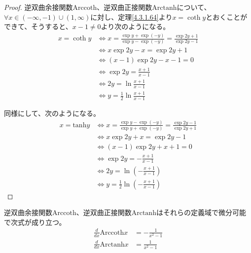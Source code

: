 \documentclass[dvipdfmx]{jsarticle}
\begin{document}
\begin{proof}
逆双曲余接関数$\mathrm{Arccoth}$、逆双曲正接関数$\mathrm{Arctanh}$について、$\forall x \in ( - \infty, - 1) \cup (1,\infty)$に対し、定理\ref{4.3.1.64}より$x = \coth y$とおくことができて、そうすると、$x - 1 \neq 0$より次のようになる。
\begin{align*}
x = \coth y &\Leftrightarrow x = \frac{\exp y + \exp( - y)}{\exp y - \exp( - y)} = \frac{\exp{2y} + 1}{\exp{2y} - 1}\\
&\Leftrightarrow x\exp{2y} - x = \exp{2y} + 1\\
&\Leftrightarrow (x - 1)\exp{2y} - x - 1 = 0\\
&\Leftrightarrow \exp{2y} = \frac{x + 1}{x - 1}\\
&\Leftrightarrow 2y = \ln\frac{x + 1}{x - 1}\\
&\Leftrightarrow y = \frac{1}{2}\ln\frac{x + 1}{x - 1}
\end{align*}\par
同様にして、次のようになる。
\begin{align*}
x = \mathrm{tanh} y &\Leftrightarrow x = \frac{\exp y - \exp( - y)}{\exp y + \exp( - y)} = \frac{\exp{2y} - 1}{\exp{2y} + 1}\\
&\Leftrightarrow x\exp{2y} + x = \exp{2y} - 1\\
&\Leftrightarrow (x - 1)\exp{2y} + x + 1 = 0\\
&\Leftrightarrow \exp{2y} = - \frac{x + 1}{x - 1}\\
&\Leftrightarrow 2y = \ln\left( - \frac{x + 1}{x - 1} \right)\\
&\Leftrightarrow y = \frac{1}{2}\ln\left( - \frac{x + 1}{x - 1} \right)
\end{align*}
\end{proof}
\begin{thm}\label{4.3.1.66}
逆双曲余接関数$\mathrm{Arccoth}$、逆双曲正接関数$\mathrm{Arctanh}$はそれらの定義域で微分可能で次式が成り立つ。
\begin{align*}
\frac{d}{dx}{\mathrm{Arccoth}}x &= - \frac{1}{x^{2} - 1}\\
\frac{d}{dx}{\mathrm{Arctanh}}x &= \frac{1}{x^{2} - 1}
\end{align*}
\end{thm}
\end{document}

